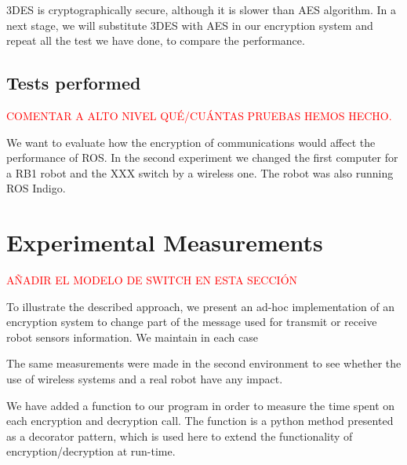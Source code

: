 \documentclass[journal,twoside]{JoPhA}
\begin{document}
3DES is cryptographically secure, although it is slower than AES algorithm. In a next stage, we will substitute 3DES with AES in our encryption system and repeat all the test we have done, to compare the performance.


\subsection{Tests performed}

\textcolor{red}{COMENTAR A ALTO NIVEL QU\'E/CU\'ANTAS PRUEBAS HEMOS HECHO.}

We want to evaluate how the encryption of communications would affect the performance of ROS.
In the second experiment we changed the first computer for a RB1 robot and the XXX switch by a wireless one. The robot was also running ROS Indigo.




\section{Experimental Measurements}

\textcolor{red}{A\~NADIR EL MODELO DE SWITCH EN ESTA SECCI\'ON}

To illustrate the described approach, we present an ad-hoc implementation of an encryption system to change part of the message used for transmit or receive robot sensors information. 
We maintain in each case 


The same measurements were made in the second environment to see whether the use of wireless systems and a real robot have any impact.



We have added a function to our program in order to measure the time spent on each encryption and decryption call. The function is a python method presented as a decorator pattern, which is used here to extend the functionality of encryption/decryption at run-time. 
\end{document}
